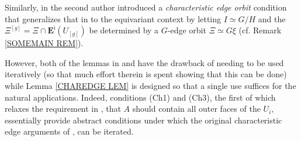 \documentclass[a4paper,10pt
,draft
]{article}%
\begin{document}
\begin{remark}
\begin{itemize}
Similarly, in \cite[Lemma 7.39]{Per17} the second author introduced a \textit{characteristic edge orbit} condition that generalizes that in \cite{MW09} to the equivariant context 
by letting $I \simeq G/H$
and the $\Xi^{[g]}=\Xi \cap \boldsymbol{E}^{\mathsf{i}}(U_{[g]})$ be determined by a $G$-edge orbit $\Xi \simeq G \xi$ (cf. Remark \ref{SOMEMAIN REM}).

However, both of the lemmas in \cite{MW09} and \cite{Per17}
have the drawback of needing to be used iteratively
(so that much effort therein is spent showing that this can be done) while Lemma \ref{CHAREDGE LEM} is designed so that a single use suffices for the natural applications.
Indeed, conditions (Ch1) and (Ch3), the first of which relaxes the requirement in \cite{MW09},\cite{Per17} that $A$ should contain all outer faces of the $U_i$, essentially provide abstract conditions under which the original characteristic edge arguments of \cite{MW09},\cite{Per17} can be iterated.
\end{itemize}
\end{remark}
\end{document}
